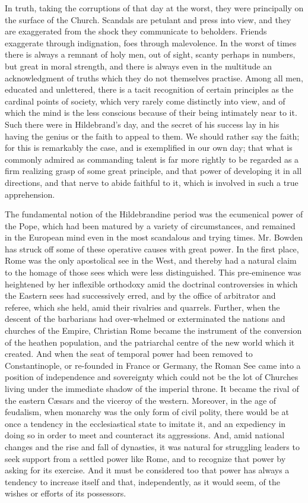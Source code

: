 In truth, taking the corruptions of that day at
the worst, they were principally on the surface of the Church.
Scandals are petulant and press into view, and they are exaggerated
from the shock they communicate to beholders. Friends exaggerate
through indignation, foes through malevolence. In the worst of
times there is always a remnant of holy men, out of sight, scanty
perhaps in numbers, but great in moral strength, and there is always
even in the multitude an acknowledgment of truths which they do not
themselves practise. Among all men, educated and unlettered, there is
a tacit recognition of certain principles as the cardinal points of
society, which very rarely come distinctly into view, and of which the
mind is the less conscious because of their being intimately near to
it. Such there were in Hildebrand's day, and the secret of his success
lay in his having the genius or the faith to appeal to them. We should
rather say the faith; for this is remarkably the case, and is
exemplified in our own day; that what is commonly admired as
commanding talent is far more rightly to be regarded as a firm
realizing grasp of some great principle, and that power of developing
it in all directions, and that nerve to abide faithful to it, which is
involved in such a true apprehension.

The fundamental notion of the Hildebrandine
period was the ecumenical power of the Pope, which had been matured by
a variety of circumstances, and remained in the European mind even in
the most scandalous and trying times. Mr. Bowden has struck off some
of these operative causes with great power. In the first place, Rome
was the only apostolical see in the West, and thereby had a natural
claim to the homage of those sees which were less distinguished. This
pre-eminence was heightened by her inflexible orthodoxy amid the
doctrinal controversies in which the Eastern sees had successively
erred, and by the office of arbitrator and referee, which she held,
amid their rivalries and quarrels. Further, when the descent of the
barbarians had over-whelmed or exterminated the nations and
churches of the Empire, Christian Rome became the instrument of the
conversion of the heathen population, and the patriarchal centre of
the new world which it created. And when the seat of temporal power
had been removed to Constantinople, or re-founded in France or
Germany, the Roman See came into a position of independence and
sovereignty which could not be the lot of Churches living under the
immediate shadow of the imperial throne. It became the rival of the
eastern Cæsars and the viceroy of the western. Moreover, in the age
of feudalism, when monarchy was the only form of civil polity, there
would be at once a tendency in the ecclesiastical state to imitate it,
and an expediency in doing so in order to meet and counteract its
aggressions. And, amid national changes and the rise and fall of
dynasties, it was natural for struggling leaders to seek support from
a settled power like Rome, and to recognize that power by asking for
its exercise. And it must be considered too that power has always a
tendency to increase itself and that, independently, as it would seem,
of the wishes or efforts of its possessors.

